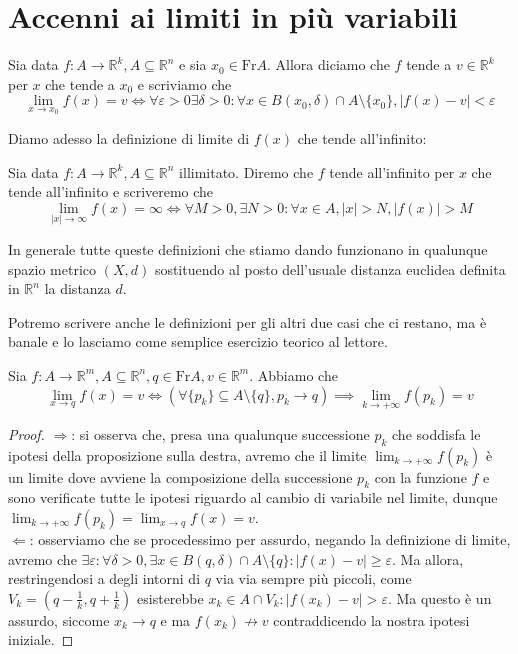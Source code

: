 \section{Accenni ai limiti in più variabili}
\begin{definition}
Sia data $f: A \to \mathbb{R}^k, A \subseteq \mathbb{R}^n$ e sia $x_0 \in \text{Fr} A$. Allora diciamo che $f$ tende a $v \in \mathbb{R}^k$ per $x$ che tende a $x_0$ e scriviamo che
$$
\lim_{x \to x_0} f(x) = v \iff \forall \varepsilon > 0 \exists \delta > 0 : \forall x \in B(x_0, \delta) \cap A \setminus \{ x_0 \}, |f(x) - v| < \varepsilon
$$
\end{definition}
\noindent Diamo adesso la definizione di limite di $f(x)$ che tende all'infinito:
\begin{definition}
Sia data $f: A \to \mathbb{R}^k, A \subseteq \mathbb{R}^n$ illimitato. Diremo che $f$ tende all'infinito per $x$ che tende all'infinito e scriveremo che
$$
\lim_{|x| \to \infty} f(x) = \infty \iff \forall M > 0, \exists N > 0: \forall x \in A, |x| > N, |f(x)| > M
$$
\end{definition}
\begin{remark}
In generale tutte queste definizioni che stiamo dando funzionano in qualunque spazio metrico $(X,d)$ sostituendo al posto dell'usuale distanza euclidea definita in $\mathbb{R}^n$ la distanza $d$.
\end{remark}
\noindent Potremo scrivere anche le definizioni per gli altri due casi che ci restano, ma è banale e lo lasciamo come semplice esercizio teorico al lettore. \\
\begin{theorem}
Sia $f: A \to \mathbb{R}^m, A \subseteq \mathbb{R}^n, q \in \text{Fr} A, v \in \mathbb{R}^m$. Abbiamo che
$$
\lim_{x \to q} f(x) = v \iff (\forall \{ p_k \} \subseteq A \setminus \{ q \}, p_k \to q) \implies \lim_{k \to +\infty} f(p_k) = v
$$
\end{theorem}
\begin{proof} \hspace{1em} \newline
$\boxed{\Rightarrow}$: si osserva che, presa una qualunque successione $p_k$ che soddisfa le ipotesi della proposizione sulla destra, avremo che il limite $\lim_{k \to +\infty} f(p_k)$ è un limite dove avviene la composizione della successione $p_k$ con la funzione $f$ e sono verificate tutte le ipotesi riguardo al cambio di variabile nel limite, dunque $\lim_{k \to +\infty} f(p_k) = \lim_{x \to q} f(x) = v$. \\
$\boxed{\Leftarrow}$: osserviamo che se procedessimo per assurdo, negando la definizione di limite, avremo che $\exists \varepsilon: \forall \delta > 0, \exists x \in B(q, \delta) \cap A \setminus \{ q \}: |f(x) - v| \geq \varepsilon$. Ma allora, restringendosi a degli intorni di $q$ via via sempre più piccoli, come $V_k = (q-\frac{1}{k}, q + \frac{1}{k})$ esisterebbe $x_k \in A \cap V_k : |f(x_k) - v| > \varepsilon$. Ma questo è un assurdo, siccome $x_k \to q$ e ma $f(x_k) \not\to v$ contraddicendo la nostra ipotesi iniziale.
\end{proof}
